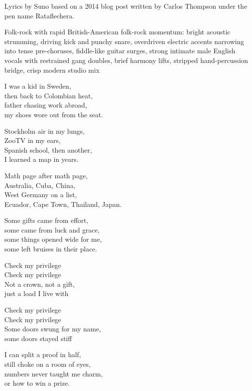 
\begin{notes}
Lyrics by Suno based on a 2014 blog post written by Carlos Thompson under the pen name Rataflechera.
\end{notes}
\begin{style}
Folk-rock with rapid British-American folk-rock momentum: bright acoustic strumming, driving kick and punchy snare, overdriven electric accents narrowing into tense pre-choruses, fiddle-like guitar surges, strong intimate male English vocals with restrained gang doubles, brief harmony lifts, stripped hand-percussion bridge, crisp modern studio mix
\end{style}
\begin{lyrics}
I was a kid in Sweden,\\
then back to Colombian heat,\\
father chasing work abroad,\\
my shoes wore out from the seat.

Stockholm air in my lungs,\\
ZooTV in my ears,\\
Spanish school, then another,\\
I learned a map in years.

Math page after math page,\\
Australia, Cuba, China,\\
West Germany on a list,\\
Ecuador, Cape Town, Thailand, Japan.

Some gifts came from effort,\\
some came from luck and grace,\\
some things opened wide for me,\\
some left bruises in their place.

Check my privilege\\
Check my privilege\\
Not a crown, not a gift,\\
just a load I live with

Check my privilege\\
Check my privilege\\
Some doors swung for my name,\\
some doors stayed stiff

I can split a proof in half,\\
still choke on a room of eyes,\\
numbers never taught me charm,\\
or how to win a prize.


\end{lyrics}
